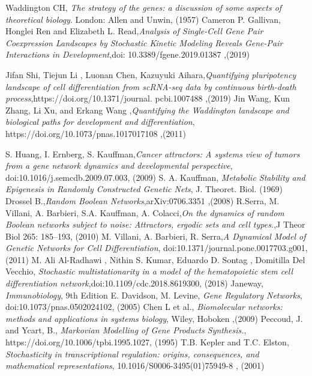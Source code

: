 \begin{thebibliography}{90}             %
\rhead[\fancyplain{}{\bfseries \leftmark}]{\fancyplain{}{\bfseries
\thepage}}

 Waddington CH, \emph{The strategy of the genes: a discussion of some aspects of theoretical biology}. London: Allen and Unwin, (1957)
 Cameron P. Gallivan, Honglei Ren and Elizabeth L. Read,\emph{Analysis of Single-Cell Gene Pair
Coexpression Landscapes by
Stochastic Kinetic Modeling Reveals
Gene-Pair Interactions in
Development},doi: 10.3389/fgene.2019.01387 ,(2019)

 Jifan Shi, Tiejun Li , Luonan Chen, Kazuyuki Aihara,\emph{Quantifying pluripotency landscape of cell
differentiation from scRNA-seq data by
continuous birth-death process},https://doi.org/10.1371/journal.
pcbi.1007488 ,(2019)
 Jin Wang, Kun Zhang, Li Xu, and Erkang Wang ,\emph{Quantifying the Waddington landscape and biological
paths for development and differentiation}, https://doi.org/10.1073/pnas.1017017108 ,(2011)

 S. Huang, I. Ernberg, S. Kauffman,\emph{Cancer attractors: A systems view of tumors from a gene network
dynamics and developmental perspective}, doi:10.1016/j.semcdb.2009.07.003, (2009)
 S. A. Kauffman, \emph{Metabolic Stability and Epigenesis in
Randomly Constructed Genetic Nets}, J. Theoret. Biol. (1969)
 Drossel B.,\emph{Random Boolean Networks},arXiv:0706.3351 ,(2008)
 R.Serra, M. Villani, A. Barbieri, S.A. Kauffman, A. Colacci,\emph{On the dynamics of random Boolean networks subject to noise:
Attractors, ergodic sets and cell types.},J Theor Biol 265: 185–193, (2010)
 M. Villani, A. Barbieri, R. Serra,\emph{A Dynamical Model of Genetic Networks for Cell Differentiation}, doi:10.1371/journal.pone.0017703.g001,(2011)
 M. Ali Al-Radhawi , Nithin S. Kumar, Eduardo D. Sontag , Domitilla Del Vecchio, \emph{Stochastic multistationarity in a model of the hematopoietic
stem cell differentiation network},doi:10.1109/cdc.2018.8619300, (2018)
 Janeway, \emph{Immunobiology}, 9th Edition
 E. Davidson, M. Levine, \emph{Gene Regulatory Networks}, doi:10.1073/pnas.0502024102, (2005)
 Chen L et al., \emph{Biomolecular networks: methods and applications in systems biology}, Wiley, Hoboken ,(2009)
 Peccoud, J. and Ycart, B., \emph{Markovian Modelling of Gene Products Synthesis.}, https://doi.org/10.1006/tpbi.1995.1027, (1995)
 T.B. Kepler and T.C. Elston, \emph{Stochasticity in transcriptional regulation: origins, consequences, and mathematical representations}, 10.1016/S0006-3495(01)75949-8 , (2001)


\end{thebibliography}

